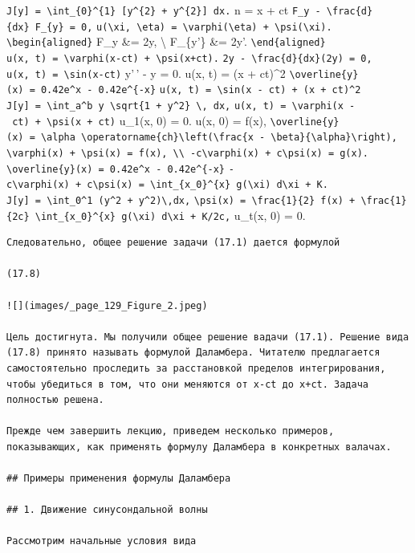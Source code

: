 \documentclass[
  ukrainian,
]{article}
\begin{document}
\texttt{J{[}y{]}\ =\ \textbackslash{}int\_\{0\}\^{}\{1\}\ {[}y\^{}\{2\}\ +\ y\textquotesingle{}\^{}\{2\}{]}\ dx.}
n = x + ct
\texttt{F\_y\ -\ \textbackslash{}frac\{d\}\{dx\}\ F\_\{y\textquotesingle{}\}\ =\ 0,}
\texttt{u(\textbackslash{}xi,\ \textbackslash{}eta)\ =\ \textbackslash{}varphi(\textbackslash{}eta)\ +\ \textbackslash{}psi(\textbackslash{}xi).}
\texttt{\textbackslash{}begin\{aligned\}} F\_y \&= 2y, \textbackslash{}
F\_\{y'\} \&= 2y'. \texttt{\textbackslash{}end\{aligned\}}
\texttt{u(x,\ t)\ =\ \textbackslash{}varphi(x-ct)\ +\ \textbackslash{}psi(x+ct).}
\texttt{2y\ -\ \textbackslash{}frac\{d\}\{dx\}(2y\textquotesingle{})\ =\ 0,}
\texttt{u(x,\ t)\ =\ \textbackslash{}sin(x-ct)} y'\,' - y = 0. u(x, t) =
(x + ct)\^{}2
\texttt{\textbackslash{}overline\{y\}(x)\ =\ 0.42e\^{}x\ -\ 0.42e\^{}\{-x\}}
\texttt{u(x,\ t)\ =\ \textbackslash{}sin(x\ -\ ct)\ +\ (x\ +\ ct)\^{}2}
\texttt{J{[}y{]}\ =\ \textbackslash{}int\_a\^{}b\ y\ \textbackslash{}sqrt\{1\ +\ y\textquotesingle{}\^{}2\}\ \textbackslash{},\ dx,}
\texttt{u(x,\ t)\ =\ \textbackslash{}varphi(x\ -\ ct)\ +\ \textbackslash{}psi(x\ +\ ct)}
u\_1(x, 0) = 0. u(x, 0) = f(x),
\texttt{\textbackslash{}overline\{y\}(x)\ =\ \textbackslash{}alpha\ \textbackslash{}operatorname\{ch\}\textbackslash{}left(\textbackslash{}frac\{x\ -\ \textbackslash{}beta\}\{\textbackslash{}alpha\}\textbackslash{}right),}
\texttt{\textbackslash{}varphi(x)\ +\ \textbackslash{}psi(x)\ =\ f(x),\ \textbackslash{}\textbackslash{}\ -c\textbackslash{}varphi\textquotesingle{}(x)\ +\ c\textbackslash{}psi\textquotesingle{}(x)\ =\ g(x).}
\texttt{\textbackslash{}overline\{y\}(x)\ =\ 0.42e\^{}x\ -\ 0.42e\^{}\{-x\}}
\texttt{-c\textbackslash{}varphi(x)\ +\ c\textbackslash{}psi(x)\ =\ \textbackslash{}int\_\{x\_0\}\^{}\{x\}\ g(\textbackslash{}xi)\ d\textbackslash{}xi\ +\ K.}
\texttt{J{[}y{]}\ =\ \textbackslash{}int\_0\^{}1\ (y\^{}2\ +\ y\textquotesingle{}\^{}2)\textbackslash{},dx,}
\texttt{\textbackslash{}psi(x)\ =\ \textbackslash{}frac\{1\}\{2\}\ f(x)\ +\ \textbackslash{}frac\{1\}\{2c\}\ \textbackslash{}int\_\{x\_0\}\^{}\{x\}\ g(\textbackslash{}xi)\ d\textbackslash{}xi\ +\ K/2c,}
u\_t(x, 0) = 0.

\begin{verbatim}
Следовательно, общее решение задачи (17.1) дается формулой

(17.8)

![](images/_page_129_Figure_2.jpeg)

Цель достигнута. Мы получили общее решение вадачи (17.1). Решение вида (17.8) принято называть формулой Даламбера. Читателю предлагается самостоятельно проследить за расстановкой пределов интегрирования, чтобы убедиться в том, что они меняются от x-ct до x+ct. Задача полностью решена.

Прежде чем завершить лекцию, приведем несколько примеров, показывающих, как применять формулу Даламбера в конкретных валачах.

## Примеры применения формулы Даламбера

## 1. Движение синусондальной волны

Рассмотрим начальные условия вида
\end{verbatim}
\end{document}

